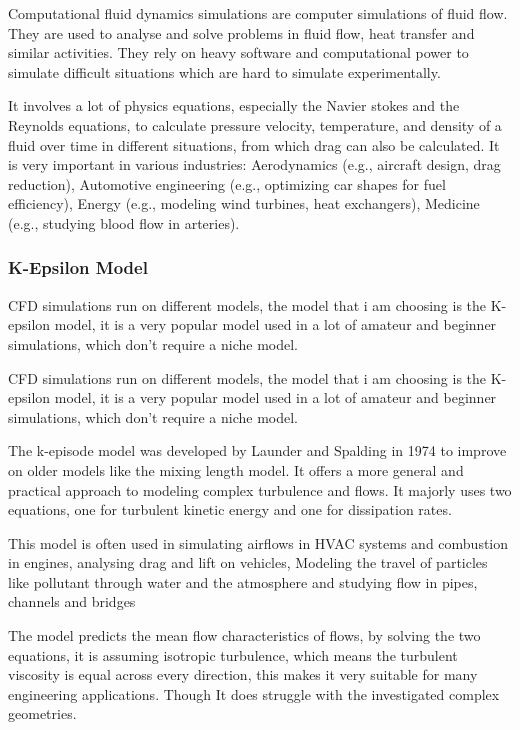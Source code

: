 \documentclass[12pt,a4paper]{article}
\begin{document}
Computational fluid dynamics simulations are computer simulations of fluid flow. They are used to analyse and solve problems in fluid flow, heat transfer and similar activities. They rely on heavy software and computational power to simulate difficult situations which are hard to simulate experimentally. 

It involves a lot of physics equations, especially the Navier stokes and the Reynolds equations, to calculate pressure velocity, temperature, and density of a fluid over time in different situations, from which drag can also be calculated. It is very important in various industries: Aerodynamics (e.g., aircraft design, drag reduction), Automotive engineering (e.g., optimizing car shapes for fuel efficiency), Energy (e.g., modeling wind turbines, heat exchangers), Medicine (e.g., studying blood flow in arteries).

\subsubsection{K-Epsilon Model}

CFD simulations run on different models, the model that i am choosing is the K-epsilon model, it is a very popular model used in a lot of amateur and beginner simulations, which don't require a niche model.

CFD simulations run on different models, the model that i am choosing is the K-epsilon model, it is a very popular model used in a lot of amateur and beginner simulations, which don't require a niche model.

The k-episode model was developed by Launder and Spalding in 1974 to improve on older models like the mixing length model. It offers a more general and practical approach to modeling complex turbulence and flows. It majorly uses two equations, one for turbulent kinetic energy and one for dissipation rates.

This model is often used in simulating airflows in HVAC systems and combustion in engines, analysing drag and lift on vehicles, Modeling the travel of particles like pollutant through water and the atmosphere and studying flow in pipes, channels and bridges

The model predicts the mean flow characteristics of flows, by solving the two equations, it is assuming isotropic turbulence, which means the turbulent viscosity is equal across every direction, this makes it very suitable for many engineering applications. Though It does struggle with the investigated complex geometries.
\end{document}
